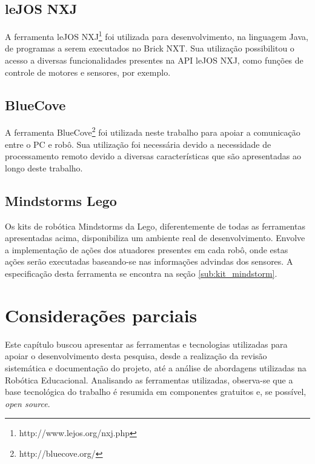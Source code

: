 	\subsection{leJOS NXJ} %
	\label{sub:lejos_nxj}
		A ferramenta leJOS NXJ\footnote{http://www.lejos.org/nxj.php} foi utilizada para desenvolvimento, na linguagem Java, de programas a serem executados no Brick NXT. Sua utilização possibilitou o acesso a diversas funcionalidades presentes na API leJOS NXJ, como funções de controle de motores e sensores, por exemplo.


	\subsection{BlueCove} %
	\label{sub:bluecove}

		A ferramenta BlueCove\footnote{http://bluecove.org/} foi utilizada neste trabalho para apoiar a comunicação entre o PC e robô. Sua utilização foi necessária devido a necessidade de processamento remoto devido a diversas características que são apresentadas ao longo deste trabalho.


	\subsection{Mindstorms Lego} %
	\label{sub:mindstorm_lego}

		Os kits de robótica Mindstorms da Lego, diferentemente de todas as ferramentas apresentadas acima, disponibiliza um ambiente real de desenvolvimento. Envolve a implementação de ações dos atuadores presentes em cada robô, onde estas ações serão executadas baseando-se nas informações advindas dos sensores. A especificação desta ferramenta se encontra na seção \ref{sub:kit_mindstorm}.


\section{Considerações parciais} %
\label{sec:considerações_parciais}

	Este capítulo buscou apresentar as ferramentas e tecnologias utilizadas para apoiar o desenvolvimento desta pesquisa, desde a realização da revisão sistemática e documentação do projeto, até a análise de abordagens utilizadas na Robótica Educacional. Analisando as ferramentas utilizadas, observa-se que a base tecnológica do trabalho é resumida em componentes gratuitos e, se possível, \textit{open source}.

